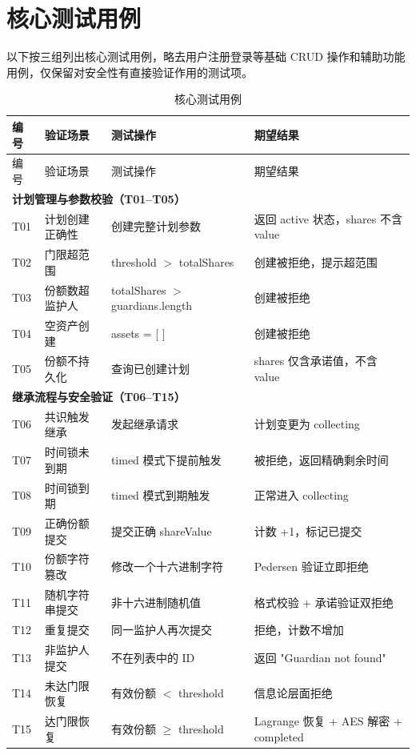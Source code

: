 \documentclass[UTF8,a4paper,zihao=-4,openany]{ctexrep}
\begin{document}
\section{核心测试用例}

以下按三组列出核心测试用例，略去用户注册登录等基础 CRUD 操作和辅助功能用例，仅保留对安全性有直接验证作用的测试项。

\setlength{\extrarowheight}{3pt}
\begin{longtable}{p{2.5cm}p{3.8cm}p{3.8cm}p{4.5cm}}
\caption{核心测试用例}\\
\toprule
编号 & 验证场景 & 测试操作 & 期望结果\\
\midrule
\endfirsthead
\toprule
编号 & 验证场景 & 测试操作 & 期望结果\\
\midrule
\endhead
\multicolumn{4}{l}{\textbf{计划管理与参数校验（T01--T05）}}\\
\midrule
T01 & 计划创建正确性 & 创建完整计划参数 & 返回 active 状态，shares 不含 value\\
T02 & 门限超范围 & threshold $>$ totalShares & 创建被拒绝，提示超范围\\
T03 & 份额数超监护人 & totalShares $>$ guardians.length & 创建被拒绝\\
T04 & 空资产创建 & assets = [ ] & 创建被拒绝\\
T05 & 份额不持久化 & 查询已创建计划 & shares 仅含承诺值，不含 value\\
\midrule
\multicolumn{4}{l}{\textbf{继承流程与安全验证（T06--T15）}}\\
\midrule
T06 & 共识触发继承 & 发起继承请求 & 计划变更为 collecting\\
T07 & 时间锁未到期 & timed 模式下提前触发 & 被拒绝，返回精确剩余时间\\
T08 & 时间锁到期 & timed 模式到期触发 & 正常进入 collecting\\
T09 & 正确份额提交 & 提交正确 shareValue & 计数 +1，标记已提交\\
T10 & 份额字符篡改 & 修改一个十六进制字符 & Pedersen 验证立即拒绝\\
T11 & 随机字符串提交 & 非十六进制随机值 & 格式校验 + 承诺验证双拒绝\\
T12 & 重复提交 & 同一监护人再次提交 & 拒绝，计数不增加\\
T13 & 非监护人提交 & 不在列表中的 ID & 返回 "Guardian not found"\\
T14 & 未达门限恢复 & 有效份额 $<$ threshold & 信息论层面拒绝\\
T15 & 达门限恢复 & 有效份额 $\ge$ threshold & Lagrange 恢复 + AES 解密 + completed\\

\end{longtable}
\end{document}
